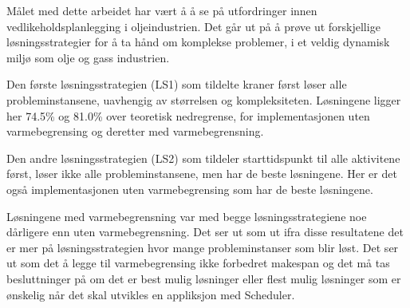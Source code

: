 Målet med dette arbeidet har vært å å se på utfordringer innen vedlikeholdsplanlegging i oljeindustrien. Det går ut på å prøve ut forskjellige løsningsstrategier for å ta hånd om komplekse problemer, i et veldig dynamisk miljø som olje og gass industrien.

Den første løsningsstrategien (LS1) som tildelte kraner først løser alle probleminstansene, uavhengig av størrelsen og kompleksiteten. Løsningene ligger her 74.5\% og 81.0\% over teoretisk nedregrense, for implementasjonen uten varmebegrensing og deretter med varmebegrensning.

Den andre løsningsstrategien (LS2) som tildeler starttidspunkt til alle aktivitene først, løser ikke alle probleminstansene, men har de beste løsningene. Her er det også implementasjonen uten varmebegrensing som har de beste løsningene.

Løsningene med varmebegrensning var med begge løsningsstrategiene noe dårligere enn uten varmebegrensning. Det ser ut som ut ifra disse resultatene det er mer på løsningsstrategien hvor mange probleminstanser som blir løst. Det ser ut som det å legge til varmebegrensing ikke forbedret makespan og det må tas besluttninger på om det er best mulig løsninger eller flest mulig løsninger som er ønskelig når det skal utvikles en appliksjon med Scheduler.